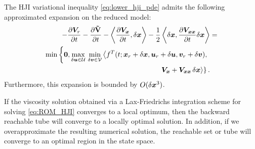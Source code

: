 \begin{theorem}
	The HJI variational inequality \cf \eqref{eq:lower_hji_pde} admits the following approximated expansion on the reduced model:
	\begin{align}
		\begin{split} 
			-\frac{\partial \valuefunc_r}{\partial t} -\frac{\partial \costdiff}{\partial t} - \left\langle \dfrac{\partial\valuefunc_{\state}}{\partial t}, \delta\state \right \rangle -  \dfrac{1}{2} \left\langle \delta \state, \dfrac{\partial \valuefunc_{\state\state} }{\partial t}\delta\state \right \rangle &=  \\
			\min \left\{\bm{0},  
			\max_{\delta \control \in \mathcal{U}} \, \min_{\delta \disturb \in \mathcal{V}} \left\langle f^T(t; \state_r + \delta \state, \control_r + \delta \control,  \disturb_r + \delta \disturb), \right. \right. \\
			\left. \left. \valuefunc_{\state} +  \valuefunc_{\state\state}\, \delta \state \right\rangle \right\}. 
		\end{split}
		\label{eq:ROM_HJI}
	\end{align}
	Furthermore, this expansion is bounded by $O(\delta \bm{x}^3)$.
	\label{th:quad_approx}
\end{theorem}
%
\begin{corollary}
	If the viscosity solution obtained via a Lax-Friedrichs integration scheme for solving \eqref{eq:ROM_HJI} converges to a local optimum, then the backward reachable tube will converge to a locally optimal solution. In addition, if we overapproximate the resulting numerical solution, the reachable set or tube will converge to an optimal region in the state space.
\end{corollary}

